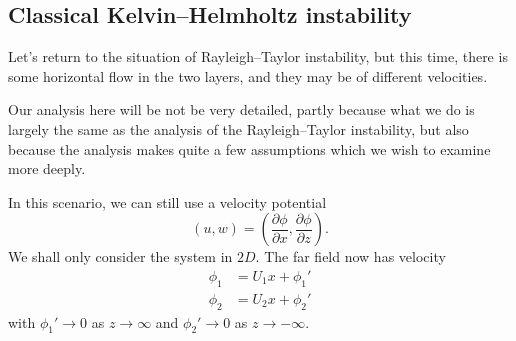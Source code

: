 \documentclass[a4paper]{article}
\begin{document}
\subsection{Classical Kelvin--Helmholtz instability}
Let's return to the situation of Rayleigh--Taylor instability, but this time, there is some horizontal flow in the two layers, and they may be of different velocities.
\begin{center}
\end{center}

Our analysis here will be not be very detailed, partly because what we do is largely the same as the analysis of the Rayleigh--Taylor instability, but also because the analysis makes quite a few assumptions which we wish to examine more deeply.

In this scenario, we can still use a velocity potential
\[
  (u, w) = \left(\frac{\partial \phi}{\partial x}, \frac{\partial \phi}{\partial z}\right).
\]
We shall only consider the system in $2D$. The far field now has velocity
\begin{align*}
  \phi_1 &= U_1 x + \phi_1'\\
  \phi_2 &= U_2 x + \phi_2'
\end{align*}
with $\phi_1' \to 0$ as $z \to \infty$ and $\phi_2' \to 0$ as $z \to -\infty$.
\end{document}
